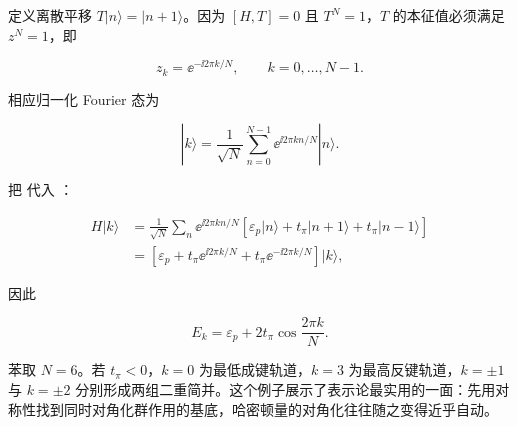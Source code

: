 定义离散平移 \(T|n\rangle=|n+1\rangle\)。因为 \([H,T]=0\) 且 \(T^N=1\)，\(T\) 的本征值必须满足 \(z^N=1\)，即

\[
z_k=\ee^{-\ii2\pi k/N},
\qquad k=0,\ldots,N-1.
\]

相应归一化 Fourier 态为

\begin{equation}
|k\rangle
=\frac1{\sqrt N}
\sum_{n=0}^{N-1}
 \ee^{\ii2\pi kn/N}|n\rangle.
\label{eq:ring-fourier-state}
\end{equation}

把  代入 ：

\begin{align*}
H|k\rangle
&=\frac1{\sqrt N}\sum_n \ee^{\ii2\pi kn/N}
[\varepsilon_p|n\rangle+t_\pi|n+1\rangle+t_\pi|n-1\rangle]\\
&=\left[\varepsilon_p+t_\pi \ee^{\ii2\pi k/N}
+t_\pi \ee^{-\ii2\pi k/N}\right]|k\rangle,
\end{align*}

因此

\begin{equation}
E_k=\varepsilon_p+2t_\pi\cos\frac{2\pi k}{N}.
\label{eq:ring-huckel-spectrum}
\end{equation}

苯取 \(N=6\)。若 \(t_\pi<0\)，\(k=0\) 为最低成键轨道，\(k=3\) 为最高反键轨道，\(k=\pm1\) 与 \(k=\pm2\) 分别形成两组二重简并。这个例子展示了表示论最实用的一面：先用对称性找到同时对角化群作用的基底，哈密顿量的对角化往往随之变得近乎自动。
